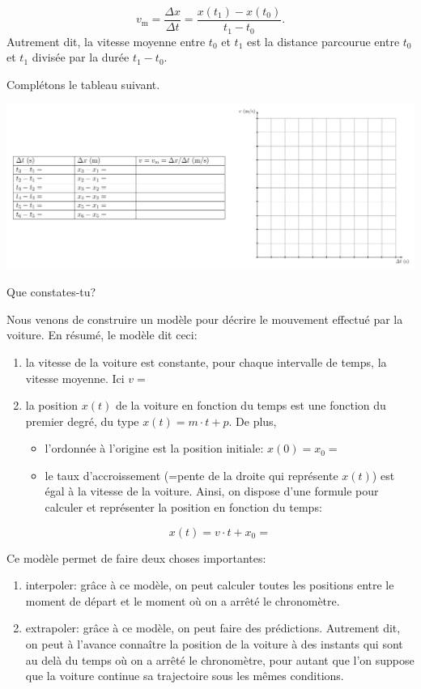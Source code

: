 \documentclass[
  a4paper,
  DIV=11,
  numbers=noendperiod,
  sans]{scrartcl}
\providecommand{\tightlist}{%
  \setlength{\itemsep}{0pt}\setlength{\parskip}{0pt}}\usepackage{longtable,booktabs,array}
\theoremstyle{definition}
\theoremstyle{definition}
\theoremstyle{remark}
\begin{document}
\[
v_{\text{m}}=\dfrac{\Delta x}{\Delta t}=\dfrac{x(t_1)-x(t_0)}{t_1-t_0}.
\] Autrement dit, la vitesse moyenne entre \(t_0\) et \(t_1\) est la
distance parcourue entre \(t_0\) et \(t_1\) divisée par la durée
\(t_1-t_0\).

Complétons le tableau suivant.

\includegraphics[width=1\textwidth,height=\textheight]{figures/mru/fig3.pdf}

Que constates-tu?

Nous venons de construire un modèle pour décrire le mouvement effectué
par la voiture. En résumé, le modèle dit ceci:

\begin{enumerate}
\def\labelenumi{\arabic{enumi}.}
\tightlist
\item
  la vitesse de la voiture est constante, pour chaque intervalle de
  temps, la vitesse moyenne. Ici \(v=\)
\item
  la position \(x(t)\) de la voiture en fonction du temps est une
  fonction du premier degré, du type \(x(t)=m\cdot t+p\). De plus,

  \begin{itemize}
  \tightlist
  \item
    l'ordonnée à l'origine est la position initiale: \(x(0)=x_0=\)
  \item
    le taux d'accroissement (=pente de la droite qui représente
    \(x(t)\)) est égal à la vitesse de la voiture. Ainsi, on dispose
    d'une formule pour calculer et représenter la position en fonction
    du temps:
  \end{itemize}

  \[
  x(t)=v\cdot t+x_0=
  \]
\end{enumerate}

Ce modèle permet de faire deux choses importantes:

\begin{enumerate}
\def\labelenumi{\arabic{enumi}.}
\tightlist
\item
  interpoler: grâce à ce modèle, on peut calculer toutes les positions
  entre le moment de départ et le moment où on a arrêté le chronomètre.
\item
  extrapoler: grâce à ce modèle, on peut faire des prédictions.
  Autrement dit, on peut à l'avance connaître la position de la voiture
  à des instants qui sont au delà du temps où on a arrêté le
  chronomètre, pour autant que l'on suppose que la voiture continue sa
  trajectoire sous les mêmes conditions.
\end{enumerate}
\end{document}
